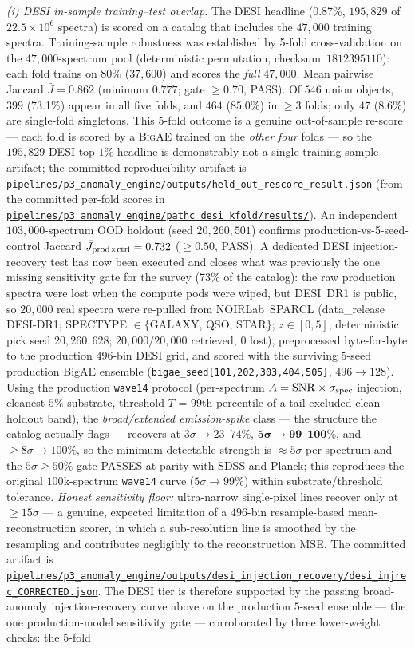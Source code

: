 \documentclass[aps,prd,twocolumn,superscriptaddress,showpacs,preprintnumbers,nofootinbib,longbibliography,floatfix]{revtex4-2}
\newcommand{\repoBase}{https://github.com/Hubify-Projects/bigbounce/blob/main}
\newcommand{\artifact}[1]{\href{\repoBase/#1}{\nolinkurl{#1}}}
\newcommand{\BigAE}{\textsc{BigAE}}
\begin{document}
\textit{(i) DESI in-sample training--test overlap.} The DESI headline (0.87\%, $195{,}829$ of $22.5\!\times\!10^6$ spectra) is scored on a catalog that includes the $47{,}000$ training spectra. Training-sample robustness was established by 5-fold cross-validation on the $47{,}000$-spectrum pool (deterministic permutation, checksum~$1812395110$): each fold trains on 80\% ($37{,}600$) and scores the \emph{full} $47{,}000$. Mean pairwise Jaccard $\bar J = 0.862$ (minimum $0.777$; gate $\geq 0.70$, PASS). Of $546$ union objects, $399$ (73.1\%) appear in all five folds, and $464$ ($85.0\%$) in $\geq\!3$ folds; only $47$ (8.6\%) are single-fold singletons. This 5-fold outcome is a genuine out-of-sample re-score --- each fold is scored by a \BigAE{} trained on the \emph{other four} folds --- so the $195{,}829$ DESI top-$1\%$ headline is demonstrably not a single-training-sample artifact; the committed reproducibility artifact is \artifact{pipelines/p3\_anomaly\_engine/outputs/held\_out\_rescore\_result.json} (from the committed per-fold scores in \artifact{pipelines/p3\_anomaly\_engine/pathc\_desi\_kfold/results/}). An independent $103{,}000$-spectrum OOD holdout (seed $20{,}260{,}501$) confirms production-vs-5-seed-control Jaccard $\bar J_{\rm prod\times ctrl} = 0.732$ ($\geq 0.50$, PASS). A dedicated DESI injection-recovery test has now been executed and closes what was previously the one missing sensitivity gate for the survey (73\% of the catalog): the raw production spectra were lost when the compute pods were wiped, but DESI~DR1 is public, so $20{,}000$ real spectra were re-pulled from NOIRLab~SPARCL (data\_release DESI-DR1; SPECTYPE $\in\{$GALAXY, QSO, STAR$\}$; $z\in[0,5]$; deterministic pick seed $20{,}260{,}628$; $20{,}000/20{,}000$ retrieved, $0$ lost), preprocessed byte-for-byte to the production $496$-bin DESI grid, and scored with the surviving $5$-seed production BigAE ensemble (\texttt{bigae\_seed\{101,202,303,404,505\}}, $496\!\to\!128$). Using the production \texttt{wave14} protocol (per-spectrum $A = \mathrm{SNR}\times\sigma_{\rm spec}$ injection, cleanest-$5\%$ substrate, threshold $T$ = 99th percentile of a tail-excluded clean holdout band), the \emph{broad/extended emission-spike} class --- the structure the catalog actually flags --- recovers at $3\sigma\to23$--$74\%$, $\mathbf{5\sigma\to99}$--$\mathbf{100\%}$, and $\geq\!8\sigma\to100\%$, so the minimum detectable strength is ${\approx}5\sigma$ per spectrum and the $5\sigma\geq50\%$ gate PASSES at parity with SDSS and Planck; this reproduces the original $100$k-spectrum \texttt{wave14} curve ($5\sigma\to99\%$) within substrate/threshold tolerance. \emph{Honest sensitivity floor:} ultra-narrow single-pixel lines recover only at $\geq\!15\sigma$ --- a genuine, expected limitation of a $496$-bin resample-based mean-reconstruction scorer, in which a sub-resolution line is smoothed by the resampling and contributes negligibly to the reconstruction MSE. The committed artifact is \artifact{pipelines/p3\_anomaly\_engine/outputs/desi\_injection\_recovery/desi\_injrec\_CORRECTED.json}. The DESI tier is therefore supported by the passing broad-anomaly injection-recovery curve above on the production $5$-seed ensemble --- the one production-model sensitivity gate --- corroborated by three lower-weight checks: the 5-fold 
\end{document}
